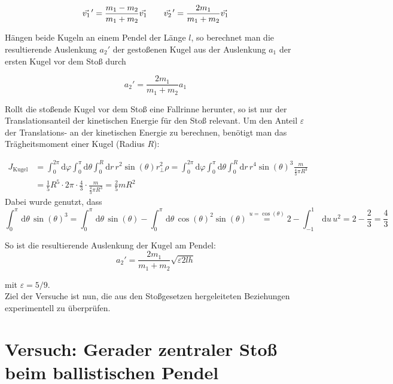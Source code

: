 \begin{equation}
  \pvec{v_1}'=\frac{m_1-m_2}{m_1+m_2}\vec{v_1} \qquad \pvec{v_2}'=\frac{2m_1}{m_1+m_2}\vec{v_1}
  \label{eq:stossgeschw}
\end{equation}

Hängen beide Kugeln an einem Pendel der Länge $l$, so berechnet man die resultierende Auslenkung $a_2'$ der gestoßenen Kugel aus der Auslenkung $a_1$ der ersten Kugel vor dem Stoß durch

\begin{equation}
  a_2'=\frac{2m_1}{m_1+m_2}a_1
  \label{eq:auslenkung}
\end{equation}

Rollt die stoßende Kugel vor dem Stoß eine Fallrinne herunter, so ist nur der Translationsanteil der kinetischen Energie für den Stoß relevant. Um den Anteil $\varepsilon$ der Translations- an der kinetischen Energie zu berechnen, benötigt man das Trägheitsmoment einer Kugel (Radius $R$):

\begin{align}
  J_{\text{Kugel}}&=\int_0^{2\pi}\mathrm{d}\varphi\int_0^\pi\mathrm{d}\theta\int_0^R \mathrm{d}r \, r^2 \sin(\theta)r_\bot^2 \rho
  =\int_0^{2\pi}\mathrm{d}\varphi\int_0^\pi\mathrm{d}\theta\int_0^R \mathrm{d}r \, r^4\sin(\theta)^3 \frac{m}{\frac{4}{3}\pi R^3} \\
  &=\frac{1}{5}R^5 \cdot 2\pi\cdot \frac{4}{3}\cdot \frac{m}{\frac{4}{3}\pi R^3} = \frac{2}{5}mR^2
  \label{eq:traegheitsmom}
\end{align}
Dabei wurde genutzt, dass 
\begin{equation}
  \int_0^\pi \, \mathrm{d}\theta\, \sin(\theta)^3=\int_0^\pi \, \mathrm{d}\theta\, \sin(\theta) - \int_0^\pi \, \mathrm{d}\theta\, \cos(\theta)^2 \sin(\theta)\overset{u = \cos(\theta)}{=}2-\int_{-1}^1 \, \mathrm{d}u \, u^2 =2 - \frac{2}{3}=\frac{4}{3}
  \label{eq:sinintegral}
\end{equation}

So ist die resultierende Auslenkung der Kugel am Pendel:
\begin{equation}
  a_2'=\frac{2m_1}{m_1+m_2}\sqrt{\varepsilon 2lh}
  \label{eq:fallrinne}
\end{equation}

mit $\varepsilon=5/9$.\\

Ziel der Versuche ist nun, die aus den Stoßgesetzen hergeleiteten Beziehungen experimentell zu überprüfen.

\section{Versuch: Gerader zentraler Stoß beim ballistischen Pendel}


